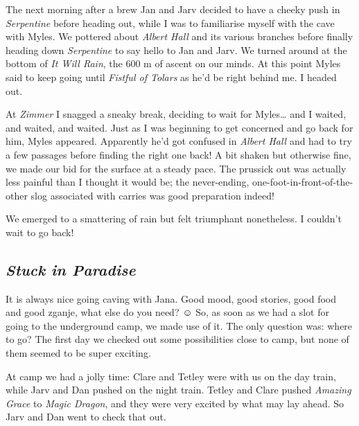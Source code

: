 The next morning after a brew Jan and Jarv decided to have a cheeky push
in \emph{Serpentine} before heading out, while I was to familiarise
myself with the cave with Myles. We pottered about \emph{Albert Hall}
and its various branches before finally heading down \emph{Serpentine}
to say hello to Jan and Jarv. We turned around at the bottom of \emph{It
Will Rain}, the 600 m of ascent on our minds. At this point Myles said
to keep going until \emph{Fistful of Tolars} as he'd be right behind me.
I headed out.

At \emph{Zimmer} I snagged a sneaky break, deciding to wait for
Myles\ldots{} and I waited, and waited, and waited. Just as I was
beginning to get concerned and go back for him, Myles appeared.
Apparently he'd got confused in \emph{Albert Hall} and had to try a few
passages before finding the right one back! A bit shaken but otherwise
fine, we made our bid for the surface at a steady pace. The prussick out
was actually less painful than I thought it would be; the never-ending,
one-foot-in-front-of-the-other slog associated with carries was good
preparation indeed!

We emerged to a smattering of rain but felt triumphant nonetheless. I
couldn't wait to go back!


\hypertarget{stuck-in-paradise}{%
\subsection{\texorpdfstring{\emph{Stuck in
Paradise}}{Stuck in Paradise}}\label{stuck-in-paradise}}

It is always nice going caving with Jana. Good mood, good stories, good
food and good zganje, what else do you need? ☺ So, as soon as we had a
slot for going to the underground camp, we made use of it. The only
question was: where to go? The first day we checked out some
possibilities close to camp, but none of them seemed to be super
exciting.

At camp we had a jolly time: Clare and Tetley were with us on the day
train, while Jarv and Dan pushed on the night train. Tetley and Clare
pushed \emph{Amazing Grace} to \emph{Magic Dragon}, and they were very
excited by what may lay ahead. So Jarv and Dan went to check that out.

